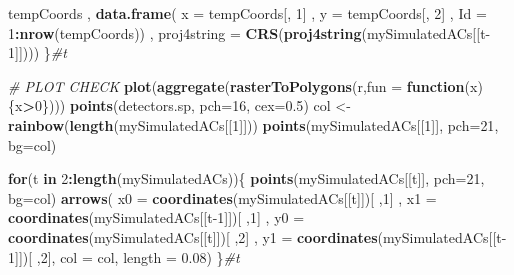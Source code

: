 \documentclass[
]{article}
\newenvironment{Shaded}{\begin{snugshade}}{\end{snugshade}}
\newcommand{\CommentTok}[1]{\textcolor[rgb]{0.56,0.35,0.01}{\textit{#1}}}
\newcommand{\ControlFlowTok}[1]{\textcolor[rgb]{0.13,0.29,0.53}{\textbf{#1}}}
\newcommand{\DataTypeTok}[1]{\textcolor[rgb]{0.13,0.29,0.53}{#1}}
\newcommand{\DecValTok}[1]{\textcolor[rgb]{0.00,0.00,0.81}{#1}}
\newcommand{\FloatTok}[1]{\textcolor[rgb]{0.00,0.00,0.81}{#1}}
\newcommand{\KeywordTok}[1]{\textcolor[rgb]{0.13,0.29,0.53}{\textbf{#1}}}
\newcommand{\NormalTok}[1]{#1}
\newcommand{\OperatorTok}[1]{\textcolor[rgb]{0.81,0.36,0.00}{\textbf{#1}}}
\newcommand{\StringTok}[1]{\textcolor[rgb]{0.31,0.60,0.02}{#1}}
\begin{document}
\begin{Shaded}
\begin{Highlighting}[]
\NormalTok{                            tempCoords}
\NormalTok{                            , }\KeywordTok{data.frame}\NormalTok{( }\DataTypeTok{x =}\NormalTok{ tempCoords[, }\DecValTok{1}\NormalTok{]}
\NormalTok{                                         , }\DataTypeTok{y =}\NormalTok{ tempCoords[, }\DecValTok{2}\NormalTok{]}
\NormalTok{                                         , }\DataTypeTok{Id =} \DecValTok{1}\OperatorTok{:}\KeywordTok{nrow}\NormalTok{(tempCoords))}
\NormalTok{                            , }\DataTypeTok{proj4string =} 
                              \KeywordTok{CRS}\NormalTok{(}\KeywordTok{proj4string}\NormalTok{(mySimulatedACs[[t}\DecValTok{-1}\NormalTok{]])))}
\NormalTok{\}}\CommentTok{#t}

\CommentTok{# PLOT CHECK}
\KeywordTok{plot}\NormalTok{(}\KeywordTok{aggregate}\NormalTok{(}\KeywordTok{rasterToPolygons}\NormalTok{(r,}\DataTypeTok{fun =} \ControlFlowTok{function}\NormalTok{(x)\{x}\OperatorTok{>}\DecValTok{0}\NormalTok{\})))}
\KeywordTok{points}\NormalTok{(detectors.sp, }\DataTypeTok{pch=}\DecValTok{16}\NormalTok{, }\DataTypeTok{cex=}\FloatTok{0.5}\NormalTok{)}
\NormalTok{col <-}\StringTok{ }\KeywordTok{rainbow}\NormalTok{(}\KeywordTok{length}\NormalTok{(mySimulatedACs[[}\DecValTok{1}\NormalTok{]]))}
\KeywordTok{points}\NormalTok{(mySimulatedACs[[}\DecValTok{1}\NormalTok{]], }\DataTypeTok{pch=}\DecValTok{21}\NormalTok{, }\DataTypeTok{bg=}\NormalTok{col)}

\ControlFlowTok{for}\NormalTok{(t }\ControlFlowTok{in} \DecValTok{2}\OperatorTok{:}\KeywordTok{length}\NormalTok{(mySimulatedACs))\{}
   \KeywordTok{points}\NormalTok{(mySimulatedACs[[t]], }\DataTypeTok{pch=}\DecValTok{21}\NormalTok{, }\DataTypeTok{bg=}\NormalTok{col)}
   \KeywordTok{arrows}\NormalTok{( }\DataTypeTok{x0 =} \KeywordTok{coordinates}\NormalTok{(mySimulatedACs[[t]])[ ,}\DecValTok{1}\NormalTok{]}
\NormalTok{           , }\DataTypeTok{x1 =} \KeywordTok{coordinates}\NormalTok{(mySimulatedACs[[t}\DecValTok{-1}\NormalTok{]])[ ,}\DecValTok{1}\NormalTok{]}
\NormalTok{           , }\DataTypeTok{y0 =} \KeywordTok{coordinates}\NormalTok{(mySimulatedACs[[t]])[ ,}\DecValTok{2}\NormalTok{]}
\NormalTok{           , }\DataTypeTok{y1 =} \KeywordTok{coordinates}\NormalTok{(mySimulatedACs[[t}\DecValTok{-1}\NormalTok{]])[ ,}\DecValTok{2}\NormalTok{], }\DataTypeTok{col =}\NormalTok{ col, }\DataTypeTok{length =} \FloatTok{0.08}\NormalTok{)}
\NormalTok{\}}\CommentTok{#t}
\end{Highlighting}
\end{Shaded}
\end{document}

